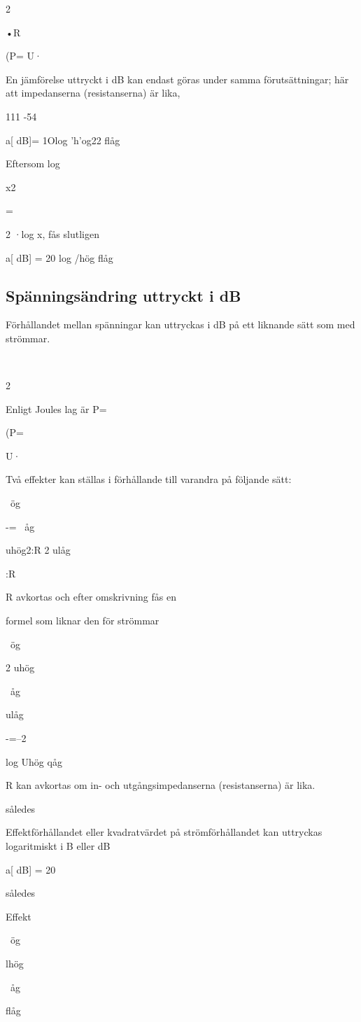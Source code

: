 \documentclass[a4paper,twoside,twocolumn,openright]{book}
\begin{document}
{{2

•R

(P= U·~

En jämförelse uttryckt i dB kan endast göras
under samma förutsättningar; här att impedanserna (resistanserna) är lika,

111 -54

a[ dB]= 1Olog 'h'og22
flåg

Eftersom log

x2

=

2 ·log x, fås slutligen

a[ dB] = 20 log /hög
flåg

\subsection{Spänningsändring uttryckt i dB}
Förhållandet mellan spänningar kan uttryckas i dB på ett liknande sätt som med
strömmar.

~

2

Enligt Joules lag är P=

(P=

U·~

Två effekter kan ställas i förhållande till varandra på följande sätt:

~ög

-=
~åg

uhög2:R
2
ulåg

:R

R avkortas och efter omskrivning fås en

formel som liknar den för strömmar

~ög

2
uhög

~åg

ulåg

-=--2

log Uhög
qåg

R kan avkortas om in- och utgångsimpedanserna (resistanserna) är lika.

således

Effektförhållandet eller kvadratvärdet på
strömförhållandet kan uttryckas logaritmiskt
i B eller dB

a[ dB] = 20

således

Effekt

~ög

lhög

~åg

flåg

}}
\end{document}
